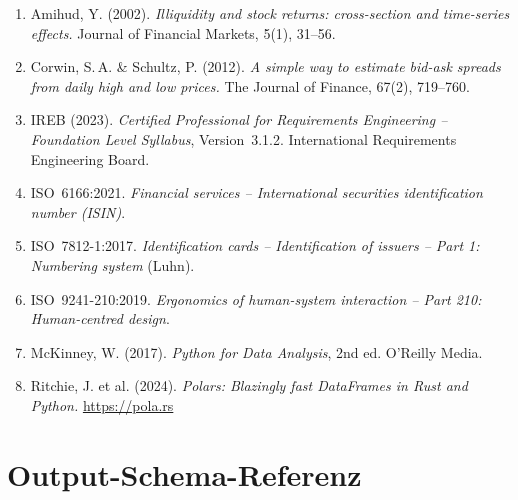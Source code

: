 \documentclass[11pt, a4paper, oneside, openany]{report}
\begin{document}
\begin{enumerate}
  \item Amihud, Y. (2002). \textit{Illiquidity and stock returns: cross-section and time-series effects.} Journal of Financial Markets, 5(1), 31--56.
  \item Corwin, S.\,A. \& Schultz, P. (2012). \textit{A simple way to estimate bid-ask spreads from daily high and low prices.} The Journal of Finance, 67(2), 719--760.
  \item IREB (2023). \textit{Certified Professional for Requirements Engineering -- Foundation Level Syllabus}, Version~3.1.2. International Requirements Engineering Board.
  \item ISO~6166:2021. \textit{Financial services -- International securities identification number (ISIN)}.
  \item ISO~7812-1:2017. \textit{Identification cards -- Identification of issuers -- Part 1: Numbering system} (Luhn).
  \item ISO~9241-210:2019. \textit{Ergonomics of human-system interaction -- Part 210: Human-centred design}.
  \item McKinney, W. (2017). \textit{Python for Data Analysis}, 2nd ed. O'Reilly Media.
  \item Ritchie, J. et al. (2024). \textit{Polars: Blazingly fast DataFrames in Rust and Python.} \url{https://pola.rs}
\end{enumerate}


\appendix

\chapter{Output-Schema-Referenz}
\label{app:schema}
\end{document}
